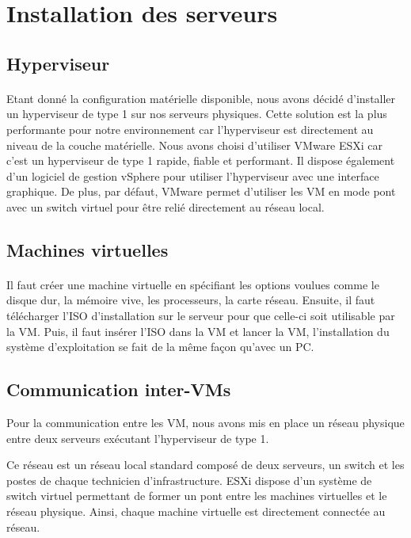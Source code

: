 \section{Installation des serveurs}
	\subsection{Hyperviseur}
		\paragraph{}
			Etant donné la configuration matérielle disponible, nous avons décidé d’installer un hyperviseur de type 1 sur nos serveurs physiques. Cette solution est la plus performante pour notre environnement car l’hyperviseur est directement au niveau de la couche matérielle. Nous avons choisi d’utiliser VMware ESXi car c’est un hyperviseur de type 1 rapide, fiable et performant. Il dispose également d’un logiciel de gestion vSphere pour utiliser l’hyperviseur avec une interface graphique. De plus, par défaut, VMware permet d’utiliser les VM en mode pont avec un switch virtuel pour être relié directement au réseau local.

	\subsection{Machines virtuelles}
		\paragraph{}
			Il faut créer une machine virtuelle en spécifiant les options voulues comme le disque dur, la mémoire vive, les processeurs, la carte réseau. Ensuite, il faut télécharger l’ISO d’installation sur le serveur pour que celle-ci soit utilisable par la VM. Puis, il faut insérer l’ISO dans la VM et lancer la VM, l’installation du système d’exploitation se fait de la même façon qu’avec un PC. 

	\subsection{Communication inter-VMs}

Pour la communication entre les VM, nous avons mis en place un réseau physique entre deux serveurs exécutant l'hyperviseur de type 1.

Ce réseau est un réseau local standard composé de deux serveurs, un switch et les postes de chaque technicien d'infrastructure.
ESXi dispose d'un système de switch virtuel permettant de former un pont entre les machines virtuelles et le réseau physique.
Ainsi, chaque machine virtuelle est directement connectée au réseau.

